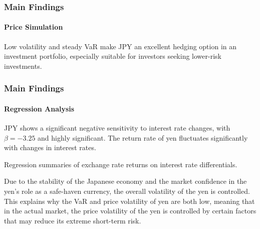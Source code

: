 \documentclass[10pt]{beamer}
\begin{document}
\begin{frame}
\frametitle{Main Findings}
\framesubtitle{Price Simulation}
Low volatility and steady VaR make JPY an excellent hedging option in an investment portfolio, especially suitable for investors seeking lower-risk investments.
\end{frame}
\begin{frame}
\frametitle{Main Findings}
\framesubtitle{Regression Analysis}
JPY shows a significant negative sensitivity to interest rate
changes, with $\beta = -3.25$ and highly significant. The return rate of yen fluctuates significantly with changes in interest rates.
\begin{table}[h]
\centering
\caption{\footnotesize Regression summaries of exchange rate returns on interest rate differentials.} 
\label{tab:var_results}
\end{table}
Due to the stability of the Japanese economy and the market confidence in the yen’s role as a safe-haven currency, the overall volatility of the yen is controlled. This explains why the VaR and price volatility of yen are both low, meaning that in the actual market, the price volatility of the yen is controlled by certain factors that may reduce its extreme
short-term risk.
\end{frame}
\end{document}
